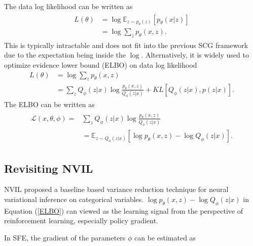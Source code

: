 \documentclass[11pt,a4paper]{article}
\begin{document}
The data log likelihood can be written as 
\begin{align}
    \begin{split}
        L(\theta) & = \log \mathbb{E}_{z \sim p_\theta(z)} [p_\theta(x|z)] \\
        & = \log \sum_z p_\theta(x,z).
    \end{split}
\end{align}
This is typically intractable and does not fit into the previous SCG framework due to the expectation being inside the $\log$. Alternatively, it is widely used to optimize evidence lower bound (ELBO) on data log likelihood
\begin{equation}
    \begin{split}
        L(\theta) & = \log \sum_z p_\theta(x,z) \\
        & = \sum_z Q_\phi(z|x) \log \frac{p_\theta(x,z)}{Q_\phi(z|x)} + KL[Q_\phi(z|x), p(z|x)].
    \end{split}
\end{equation}
The ELBO can be written as 
\begin{align}
\label{ELBO}
    \begin{split}
        \mathcal{L}(x, \theta, \phi) = & \sum_z Q_\phi(z|x) \log \frac{p_\theta(x,z)}{Q_\phi(z|x)} \\
            & = \mathbb{E}_{z \sim Q_\phi(z|x)} [\log p_\theta(x,z) - \log Q_\phi(z|x)].
    \end{split}
\end{align}


\subsection{Revisiting NVIL}


NVIL proposed a baseline based variance reduction technique for neural variational inference on categorical variables. 
$\log p_\theta(x,z) - \log Q_\phi(z|x)$ in Equation (\ref{ELBO}) can viewed as the learning signal from the perspective of reinforcement learning, especially policy gradient. 

In SFE, the gradient of the parameters $\phi$ can be estimated as
\end{document}
